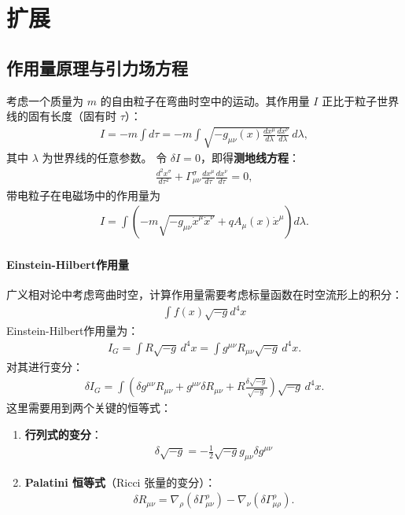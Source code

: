 \section{扩展}
\subsection{作用量原理与引力场方程}
考虑一个质量为 $m$ 的自由粒子在弯曲时空中的运动。其作用量 $I$ 正比于粒子世界线的固有长度（固有时 $\tau$）：
\begin{align}
I = -m \int d\tau = -m \int \sqrt{-g_{\mu\nu}(x) \frac{dx^\mu}{d\lambda} \frac{dx^\nu}{d\lambda}} \, d\lambda,
\end{align}
其中 $\lambda$ 为世界线的任意参数。
令 $\delta I = 0$，即得\textbf{测地线方程}：
\begin{align}
\frac{d^2x^\sigma}{d\tau^2} + \Gamma^\sigma_{\mu\nu} \frac{dx^\mu}{d\tau} \frac{dx^\nu}{d\tau} = 0,
\end{align}
带电粒子在电磁场中的作用量为
\begin{align}
I = \int \left( -m\sqrt{-g_{\mu\nu}\dot{x}^\mu\dot{x}^\nu} + q A_\mu(x) \dot{x}^\mu \right) d\lambda.
\end{align}

\paragraph{Einstein-Hilbert作用量}
广义相对论中考虑弯曲时空，计算作用量需要考虑标量函数在时空流形上的积分：
\begin{align}
    \int f(x) \sqrt{-g}d^4x
\end{align}
Einstein-Hilbert作用量为：
\begin{align}
I_G = \int R \sqrt{-g} \, d^4x = \int g^{\mu\nu} R_{\mu\nu} \sqrt{-g} \, d^4x.
\end{align}
对其进行变分：
\begin{align}
\delta I_G = \int \left( \delta g^{\mu\nu} R_{\mu\nu} + g^{\mu\nu} \delta R_{\mu\nu} + R \frac{\delta \sqrt{-g}}{\sqrt{-g}} \right) \sqrt{-g} \, d^4x.
\end{align}
这里需要用到两个关键的恒等式：
\begin{enumerate}
    \item \textbf{行列式的变分}：
        \begin{align}
            \delta \sqrt{-g} = -\frac{1}{2}\sqrt{-g} g_{\mu\nu} \delta g^{\mu\nu}
        \end{align}
    \item \textbf{Palatini 恒等式}（Ricci 张量的变分）：
    \begin{align}
    \delta R_{\mu\nu} = \nabla_\rho (\delta \Gamma^\rho_{\mu\nu}) - \nabla_\nu (\delta \Gamma^\rho_{\mu\rho}).
    \end{align}
\end{enumerate}

